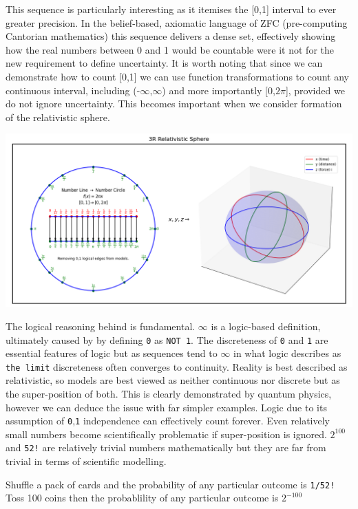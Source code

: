 \documentclass[12pt]{article}
\begin{document}
This sequence is particularly interesting as it itemises the [0,1] interval to ever greater precision. In the belief-based, axiomatic language of ZFC (pre-computing Cantorian mathematics) this sequence delivers a dense set, effectively showing how the real numbers between 0 and 1 would be countable were it not for the new requirement to define \qbit{} uncertainty. It is worth noting that since we can demonstrate how to count [0,1] we can use function transformations to count any continuous interval, including (-$\infty$,$\infty$) and more importantly [0,$2\pi$], provided we do not ignore \qbit{} uncertainty. This becomes important when we consider formation of the \iR{} relativistic sphere.

\includegraphics[width=\textwidth]{3Rsphere.png}

The logical reasoning behind \qbit{} is fundamental. $\infty$ is a logic-based definition, ultimately caused by by defining \texttt{0} as \texttt{NOT 1}. The discreteness of \texttt{0} and \texttt{1} are essential features of logic but as sequences tend to $\infty$ in what logic describes as \texttt{the limit} discreteness often converges to continuity. Reality is best described as relativistic, so models are best viewed as neither continuous nor discrete but as the super-position of both. This is clearly demonstrated by quantum physics, however we can deduce the issue with far simpler examples. Logic due to its assumption of \texttt{0},\texttt{1} independence can effectively count forever. Even relatively small numbers become scientifically problematic if \qbit{} super-position is ignored. $2^{100}$ and \texttt{52!} are relatively trivial numbers mathematically but they are far from trivial in terms of scientific modelling.

Shuffle a pack of cards and the probability of any particular outcome is \texttt{1/52!}
Toss 100 coins then the probablility of any particular outcome is $2^{-100}$
\end{document}
